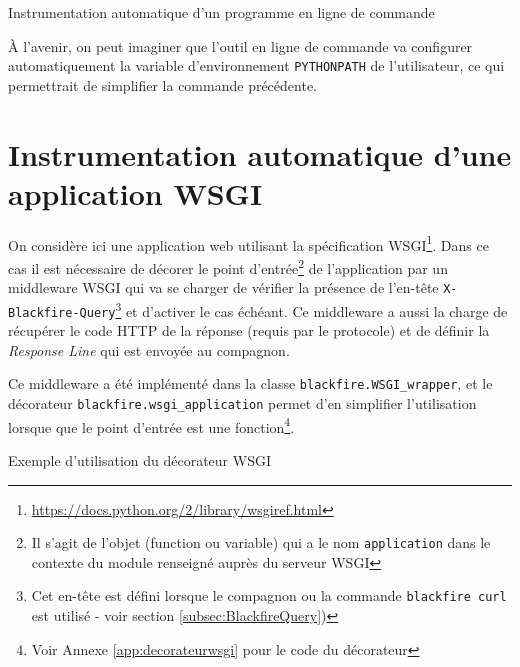 \begin{listing}[H]
\caption{Instrumentation automatique d'un programme en ligne de commande}
\end{listing}

\begin{note}
À l'avenir, on peut imaginer que l'outil en ligne de commande \Blackfire va configurer automatiquement la variable d'environnement \verb|PYTHONPATH| de l'utilisateur, ce qui permettrait de simplifier la commande précédente.
\end{note}

\section[Application WSGI]{Instrumentation automatique d'une application WSGI}
On considère ici une application web utilisant la spécification WSGI\footnote{\url{https://docs.python.org/2/library/wsgiref.html}}. Dans ce cas il est nécessaire de décorer le point d'entrée\footnote{Il s'agit de l'objet (function ou variable) qui a le nom \verb?application? dans le contexte du module renseigné auprès du serveur WSGI} de l'application par un middleware WSGI qui va se charger de vérifier la présence de l'en-tête \verb|X-Blackfire-Query|\footnote{Cet en-tête est défini lorsque le compagnon ou la commande \verb?blackfire curl? est utilisé - voir section \vref{subsec:BlackfireQuery})} et d'activer \Blackfire le cas échéant. Ce middleware a aussi la charge de récupérer le code HTTP de la réponse (requis par le protocole) et de définir la \emph{Response Line} qui est envoyée au compagnon.

Ce middleware a été implémenté dans la classe \verb|blackfire.WSGI_wrapper|, et le décorateur \verb|blackfire.wsgi_application| permet d'en simplifier l'utilisation lorsque que le point d'entrée est une fonction\footnote{Voir Annexe \vref{app:decorateurwsgi} pour le code du décorateur}.

\begin{listing}[H]
\caption{Exemple d'utilisation du décorateur WSGI}
\end{listing}



